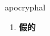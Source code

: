 
\begin{frame}
{\huge apocryphal}
\begin{center}
\begin{enumerate}\Large
  \item \textbf{假的}
\end{enumerate}
\end{center}
\end{frame}
